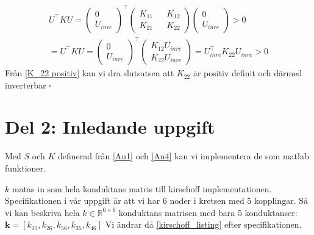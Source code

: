 \documentclass{assignment}
\def\code#1{\texttt{#1}}
\begin{document}
\begin{align}
    U^\top KU =
    \begin{pmatrix}
        0
        \\ U_{inre}
    \end{pmatrix}^\top
    \begin{pmatrix}
        K_{11} && K_{12}
        \\ K_{21} && K_{22} 
    \end{pmatrix}
    \begin{pmatrix}
        0
        \\ U_{inre}
    \end{pmatrix}>0
    \\ = U^\top KU =
    \begin{pmatrix}
        0
        \\ U_{inre}
    \end{pmatrix}^\top
    \begin{pmatrix}
        K_{12} U_{inre}
        \\ K_{22} U_{inre}
    \end{pmatrix}
    = U_{inre}^\top K_{22}U_{inre}>0 \label{K_22 positiv}
\end{align}
Från \cref{K_22 positiv} kan vi dra slutsatsen att $K_{22}$ är positiv definit och därmed inverterbar $\square$


\newpage
\section*{Del 2: Inledande uppgift}
Med $S$ och $K$ definerad från \cref{An1} och \cref{An4} kan vi implementera de som matlab funktioner.

 
$k$ matas in som hela konduktans matris till kirschoff implementationen. 
Specifikationen i vår uppgift är att vi har 6 noder i kretsen med 5 kopplingar. Så vi kan 
beskriva hela $k \in \mathbb{R}^{6 \times 6}$ konduktans matrisen med bara 5 konduktanser: $\mathbf{k}=[k_{15},k_{26},k_{56},k_{35},k_{46}]$
Vi ändrar då \cref{kirschoff_listing} efter specifikationen.
 
\end{document}
